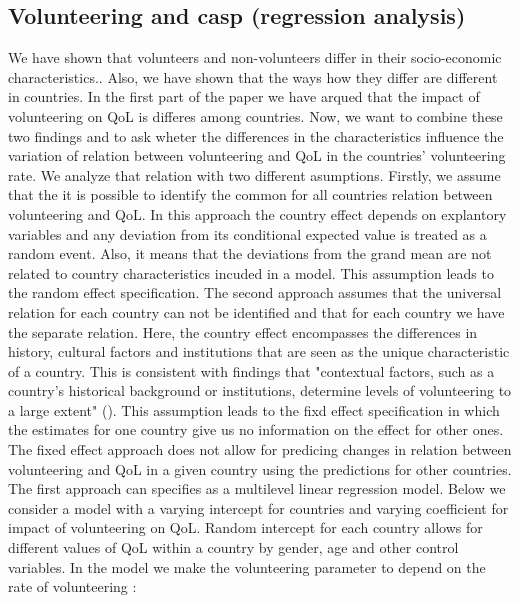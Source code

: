 \documentclass[10pt, letterpaper]{article}
\begin{document}
\begin{spacing}{1.4}
\subsection*{Volunteering and casp (regression analysis)}

We have shown that volunteers and non-volunteers differ in their  socio-economic characteristics.. Also, we have shown that  the ways how they differ are different in countries. In the first part of the paper we have arqued that the impact of volunteering on QoL is differes among countries. Now, we want to combine these two findings and to ask wheter the differences in the characteristics influence the variation of relation between volunteering and QoL in the countries' volunteering rate. We analyze that relation with two different asumptions. Firstly, we assume that the it is possible to identify the common for all countries relation between volunteering and QoL. In this approach the country effect depends on explantory variables and any deviation from its conditional expected value is treated as a random event. Also, it means that the deviations from the grand mean are not related to country characteristics incuded in a model. This assumption leads to the random effect specification.  The second approach assumes that the universal relation for each country can not be identified and that for each country we have the separate relation. Here, the country effect encompasses the differences in history, cultural factors and institutions that are seen as the unique characteristic of a country. This is consistent with findings that "contextual factors, such as a country’s historical background or institutions, determine levels of volunteering to a large extent" (\citet{plagnol10}). This assumption leads to the fixd effect specification in which the estimates for one country give us no information on the effect for other ones. The fixed effect approach does not allow for predicing changes in relation between volunteering and QoL in a given country using the predictions for other countries. \\

The first approach can specifies as a multilevel linear regression model. Below we consider a model with a varying intercept for countries and varying coefficient for impact of volunteering on QoL. Random intercept for each country allows for different values of QoL within a country by gender, age and other control variables. In the model we make the volunteering parameter to depend on the rate of volunteering :


\end{spacing}
\end{document}
